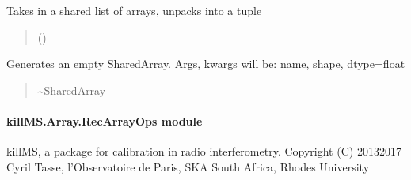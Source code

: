 \documentclass[letterpaper,10pt,english]{sphinxmanual}
\begin{document}

\begin{fulllineitems}
\label{\detokenize{api/killMS.Array:killMS.Array.NpShared.UnPackListArray}}
\pysigstartsignatures
{}
\pysigstopsignatures
\sphinxAtStartPar
Takes in a shared list of arrays, unpacks into a tuple
\begin{quote}\begin{description}
\sphinxAtStartPar
{} () \textendash{} 

\sphinxAtStartPar
{}

\end{description}\end{quote}

\end{fulllineitems}


\begin{fulllineitems}
\label{\detokenize{api/killMS.Array:killMS.Array.NpShared.zeros}}
\pysigstartsignatures
{}
\pysigstopsignatures
\sphinxAtStartPar
Generates an empty SharedArray. Args, kwargs will be:
name, shape, dtype=float
\begin{quote}\begin{description}
\sphinxAtStartPar
\textasciitilde{}SharedArray

\end{description}\end{quote}

\end{fulllineitems}



\paragraph{killMS.Array.RecArrayOps module}
\label{\detokenize{api/killMS.Array:module-killMS.Array.RecArrayOps}}\label{\detokenize{api/killMS.Array:killms-array-recarrayops-module}}
\sphinxAtStartPar
killMS, a package for calibration in radio interferometry.
Copyright (C) 2013\sphinxhyphen{}2017  Cyril Tasse, l’Observatoire de Paris,
SKA South Africa, Rhodes University
\end{document}

